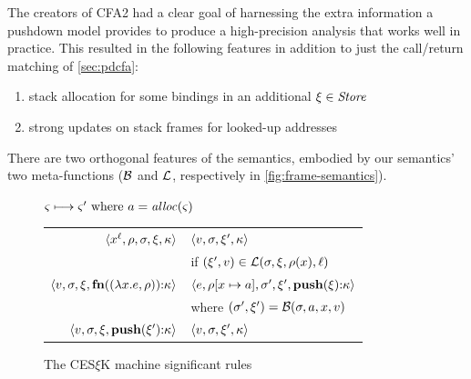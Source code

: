 The creators of CFA2 had a clear goal of harnessing the extra information a pushdown model provides to produce a high-precision analysis that works well in practice.
%
This resulted in the following features in addition to just the call/return matching of \autoref{sec:pdcfa}:
%

\begin{enumerate}
\item{stack allocation for some bindings in an additional $\mframe \in \Store$}
\item{strong updates on stack frames for looked-up addresses}
\end{enumerate}
There are two orthogonal features of the semantics, embodied by our semantics' two meta-functions ($\bind$ and $\lookup$, respectively in \autoref{fig:frame-semantics}).

\begin{figure}
  \centering
  $\mstate \stepto \mstate' \text{ where } \maddr = \alloc(\mstate)$ \\
  \begin{tabular}{r|l}
    \hline
    $\tpl{\svar[\mlab]{\mvar}, \menv, \mstore, \mframe, \mkont}$
    &
    $\tpl{\mval,\mstore,\mframe',\mkont}$
    \\ & if $(\mframe', \mval) \in \lookup(\mstore,\mframe,\menv(\mvar),\mlab)$
    \\
    $\tpl{\mval,\mstore,\mframe,\kcons{\kfn{\vclo{\slam{\mvar}{\mexpr}}{\menv}}}{\mkont}}$
    &
    $\tpl{\mexpr, \extm{\menv}{\mvar}{\maddr}, \mstore', \mframe', \kcons{\kpush{\mframe}}{\mkont}}$
    \\ & where $(\mstore',\mframe') = \bind(\mstore,\maddr,\mvar,\mval)$
    \\
    $\tpl{\mval,\mstore,\mframe,\kcons{\kpush{\mframe'}}{\mkont}}$
    &
    $\tpl{\mval,\mstore,\mframe',\mkont}$
  \end{tabular}
  \caption{The CES$\xi$K machine significant rules}
  \label{fig:frame-semantics}
\end{figure}

